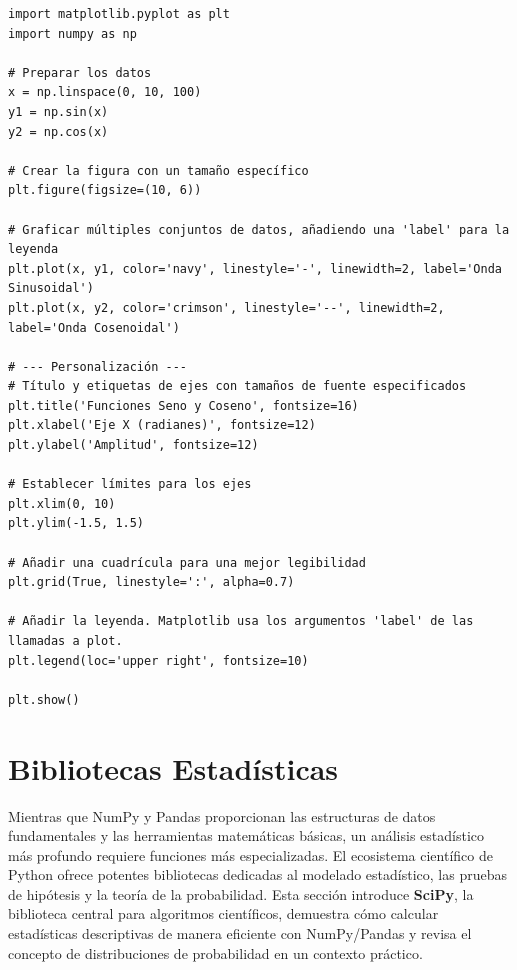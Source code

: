 \begin{example}
\text{ }\begin{verbatim}
import matplotlib.pyplot as plt
import numpy as np

# Preparar los datos
x = np.linspace(0, 10, 100)
y1 = np.sin(x)
y2 = np.cos(x)

# Crear la figura con un tamaño específico
plt.figure(figsize=(10, 6))

# Graficar múltiples conjuntos de datos, añadiendo una 'label' para la leyenda
plt.plot(x, y1, color='navy', linestyle='-', linewidth=2, label='Onda Sinusoidal')
plt.plot(x, y2, color='crimson', linestyle='--', linewidth=2, label='Onda Cosenoidal')

# --- Personalización ---
# Título y etiquetas de ejes con tamaños de fuente especificados
plt.title('Funciones Seno y Coseno', fontsize=16)
plt.xlabel('Eje X (radianes)', fontsize=12)
plt.ylabel('Amplitud', fontsize=12)

# Establecer límites para los ejes
plt.xlim(0, 10)
plt.ylim(-1.5, 1.5)

# Añadir una cuadrícula para una mejor legibilidad
plt.grid(True, linestyle=':', alpha=0.7)

# Añadir la leyenda. Matplotlib usa los argumentos 'label' de las llamadas a plot.
plt.legend(loc='upper right', fontsize=10)

plt.show()
\end{verbatim}
\end{example}

\section{Bibliotecas Estadísticas}
\label{sec:statistical_libraries}
Mientras que NumPy y Pandas proporcionan las estructuras de datos fundamentales y las herramientas matemáticas básicas, un análisis estadístico más profundo requiere funciones más especializadas. El ecosistema científico de Python ofrece potentes bibliotecas dedicadas al modelado estadístico, las pruebas de hipótesis y la teoría de la probabilidad. Esta sección introduce \textbf{SciPy}, la biblioteca central para algoritmos científicos, demuestra cómo calcular estadísticas descriptivas de manera eficiente con NumPy/Pandas y revisa el concepto de distribuciones de probabilidad en un contexto práctico.

